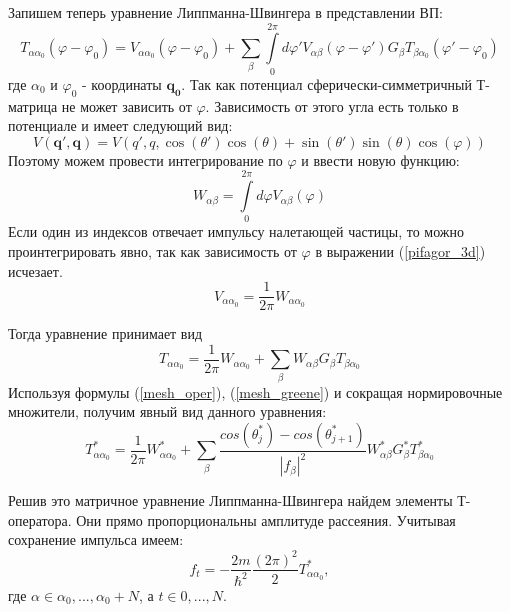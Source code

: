 \documentclass[a4paper,12pt]{article}
\newcommand{\vect}[1]{\boldsymbol{#1}}
\begin{document}
Запишем теперь уравнение Липпманна-Швингера в представлении ВП:
\begin{equation}
 T_{\alpha\alpha_0}(\varphi-\varphi_0) = 
 V_{\alpha\alpha_0}(\varphi-\varphi_0) + 
 \sum\limits_\beta \int\limits_0^{2\pi} d \varphi' V_{\alpha\beta}(\varphi-\varphi') G_{\beta} T_{\beta\alpha_0}(\varphi'-\varphi_0)
\end{equation}
где $\alpha_0$ и $\varphi_0$ - координаты $\vect{q_0}$.  Так как потенциал сферически-симметричный Т-матрица не может зависить от $\varphi$. Зависимость от этого угла есть только в потенциале и имеет следующий вид:
\begin{equation}
\label{pifagor_3d}
    V(\vect{q'},\vect{q}) = V(q',q, \cos(\theta')\cos(\theta) + \sin(\theta')\sin(\theta)\cos(\varphi) )
\end{equation} 
Поэтому можем провести интегрирование по $\varphi$ и ввести новую функцию:
\begin{equation}
    \label{phi_int}
    W_{\alpha\beta} = \int\limits_{0}^{2\pi} d\varphi V_{\alpha\beta}(\varphi)
\end{equation}
Если один из индексов отвечает импульсу налетающей частицы, то можно проинтегрировать явно, так как зависимость от $\varphi$ в выражении (\ref{pifagor_3d}) исчезает.
\begin{equation}
    V_{\alpha\alpha_0} = \frac{1}{2\pi}W_{\alpha\alpha_0}
\end{equation}

Тогда уравнение принимает вид
\begin{equation}
    T_{\alpha\alpha_0} = \frac{1}{2\pi}W_{\alpha\alpha_0} + \sum\limits_\beta  W_{\alpha\beta} G_{\beta} T_{\beta\alpha_0}
\end{equation}
Используя формулы (\ref{mesh_oper}), (\ref{mesh_greene}) и сокращая нормировочные множители, получим явный вид данного уравнения:
\begin{equation}
    T^*_{\alpha\alpha_0} = \frac{1}{2\pi}W^*_{\alpha\alpha_0} +
 \sum\limits_\beta \frac{cos(\theta_j^*)-cos(\theta_{j+1}^*)}{|f_\beta|^2} W^*_{\alpha\beta} G^*_{\beta} T^*_{\beta\alpha_0}
\end{equation}

Решив это матричное уравнение Липпманна-Швингера найдем элементы Т-оператора. Они прямо пропорциональны амплитуде рассеяния. Учитывая сохранение импульса имеем:
\begin{equation}
    f_t = - \frac{2m}{\hbar^2} \frac{(2\pi)^2}{2} T^*_{\alpha\alpha_0},
\end{equation}
где $\alpha \in {\alpha_0, ... , \alpha_0 + N}$, а $t \in {0, ... ,N} $.
\end{document}
